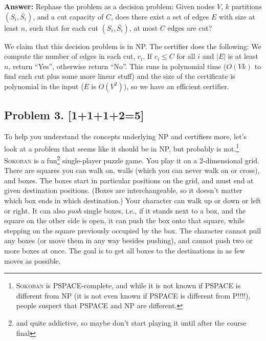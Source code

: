 \documentclass[10pt]{article}
\begin{document}
\begin{enumerate}
\textbf{Answer:} Rephase the problem as a decision problem: Given nodes \(V\), \(k\) partitions \((S_i, \bar{S_i})\), and a cut capacity of \(C\), does there exist a set of edges \(E\) with size at least \(n\), such that for each cut \((S_i, \bar{S_i})\), at most \(C\) edges are cut?

We claim that this decision problem is in NP. The certifier does the following: We compute the number of edges in each cut, \(c_i\). If \(c_i \leq C\) for all \(i\) and \(|E|\) is at least \(n\), return ``Yes'', otherwise return ``No''. This runs in polynomial time (\(O(Vk)\) to find each cut plus some more linear stuff) and the size of the certificate is polynomial in the input (\(E\) is \(O(V^2)\)), so we have an efficient certifier.
\end{enumerate}

\subsection*{Problem 3. [1+1+1+2=5]}
To help you understand the concepts underlying NP and certifiers more, let's look at a problem that seems like it should be in NP, but probably is not.\footnote{\textsc{Sokoban} is PSPACE-complete, and while it is not known if PSPACE is different from NP (it is not even known if PSPACE is different from P!!!!), people suspect that PSPACE and NP are different.}
\textsc{Sokoban} is a fun\footnote{and quite addictive, so maybe don't start playing it until after the course final} single-player puzzle game. You play it on a 2-dimensional grid. There are squares you can walk on, walls (which you can never walk on or cross), and boxes. The boxes start in particular positions on the grid, and must end at given destination positions. (Boxes are interchangeable, so it doesn't matter which box ends in which destination.) Your character can walk up or down or left or right. It can also \emph{push} single boxes, i.e., if it stands next to a box, and the square on the other side is open, it can push the box onto that square, while stepping on the square previously occupied by the box. The character cannot pull any boxes (or move them in any way besides pushing), and cannot push two or more boxes at once. The goal is to get all boxes to the destinations in as few moves as possible.
\end{document}
